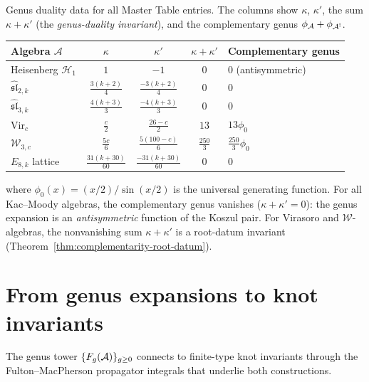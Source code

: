 \begin{computation}\label{comp:genus-duality-table}
Genus duality data for all Master Table entries.
The columns show $\kappa$, $\kappa'$, the sum $\kappa + \kappa'$
(the \emph{genus-duality invariant}), and the complementary genus
$\phi_{\mathcal{A}} + \phi_{\mathcal{A}^!}$.
\begin{center}
\renewcommand{\arraystretch}{1.2}
\begin{tabular}{lcccl}
\toprule
Algebra $\mathcal{A}$ & $\kappa$ & $\kappa'$ & $\kappa + \kappa'$ & Complementary genus \\
\midrule
Heisenberg $\mathcal{H}_1$ & $1$ & $-1$ & $0$ & $0$ (antisymmetric) \\
$\widehat{\mathfrak{sl}}_{2,k}$ & $\frac{3(k+2)}{4}$ & $\frac{-3(k+2)}{4}$ & $0$ & $0$ \\
$\widehat{\mathfrak{sl}}_{3,k}$ & $\frac{4(k+3)}{3}$ & $\frac{-4(k+3)}{3}$ & $0$ & $0$ \\
$\mathrm{Vir}_c$ & $\frac{c}{2}$ & $\frac{26-c}{2}$ & $13$ & $13\phi_0$ \\
$\mathcal{W}_{3,c}$ & $\frac{5c}{6}$ & $\frac{5(100-c)}{6}$ & $\frac{250}{3}$ & $\frac{250}{3}\phi_0$ \\
$E_{8,k}$ lattice & $\frac{31(k+30)}{60}$ & $\frac{-31(k+30)}{60}$ & $0$ & $0$ \\
\bottomrule
\end{tabular}
\end{center}
where $\phi_0(x) = (x/2)/\sin(x/2)$ is the universal generating function.
For all Kac--Moody algebras, the complementary genus vanishes
\textup{(}$\kappa + \kappa' = 0$\textup{)}: the genus expansion is an
\emph{antisymmetric} function of the Koszul pair.  For Virasoro and
$\mathcal{W}$-algebras, the nonvanishing sum $\kappa + \kappa'$ is
a root-datum invariant
\textup{(}Theorem~\textup{\ref{thm:complementarity-root-datum})}.
\end{computation}


\section{From genus expansions to knot invariants}
\label{sec:genus-knot-invariants}

The genus tower $\{F_g(\mathcal{A})\}_{g \geq 0}$ connects to finite-type
knot invariants through the Fulton--MacPherson propagator integrals
that underlie both constructions.

